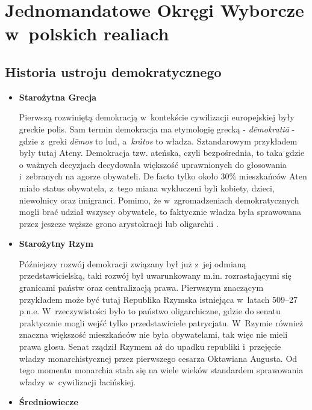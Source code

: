 
\def\filename{Rozdział 1}

\chapter{Jednomandatowe Okręgi Wyborcze w~polskich realiach}

\section{Historia ustroju demokratycznego}
\begin{itemize}

\item{\textbf{Starożytna Grecja}} 

Pierwszą rozwiniętą demokracją w~kontekście cywilizacji europejskiej były greckie polis. Sam termin demokracja ma etymologię grecką - \textit{dēmokratiā} - gdzie z~greki \textit{dēmos} to lud, a~\textit{krátos} to władza. Sztandarowym przykładem były tutaj Ateny. Demokracja tzw. ateńska, czyli bezpośrednia, to taka gdzie o ważnych decyzjach decydowała większość uprawnionych do głosowania i~zebranych na agorze obywateli. De facto tylko około 30\% mieszkańców Aten miało status obywatela, z~tego miana wykluczeni byli kobiety, dzieci, niewolnicy oraz imigranci. Pomimo, że w~zgromadzeniach demokratycznych mogli brać udział wszyscy obywatele, to faktycznie władza była sprawowana przez jeszcze węższe grono arystokracji lub oligarchii \cite{Karolczuk}.

\item{\textbf{Starożytny Rzym}}

Późniejszy rozwój demokracji związany był już z~jej odmianą przedstawicielską, taki rozwój był uwarunkowany m.in. rozrastającymi się granicami państw oraz centralizacją prawa. Pierwszym znaczącym przykładem może być tutaj Republika Rzymska istniejąca w~latach 509--27 p.n.e. W~rzeczywistości było to państwo oligarchiczne, gdzie do senatu praktycznie mogli wejść tylko przedstawiciele patrycjatu. W~Rzymie również znaczna większość mieszkańców nie była obywatelami, tak więc nie mieli prawa głosu. Senat rządził Rzymem aż do upadku republiki i~przejęcie władzy monarchistycznej przez pierwszego cesarza Oktawiana Augusta. Od tego momentu monarchia stała się na wiele wieków standardem sprawowania władzy w~cywilizacji łacińskiej.

\item{\textbf{Średniowiecze}}


\end{itemize}
